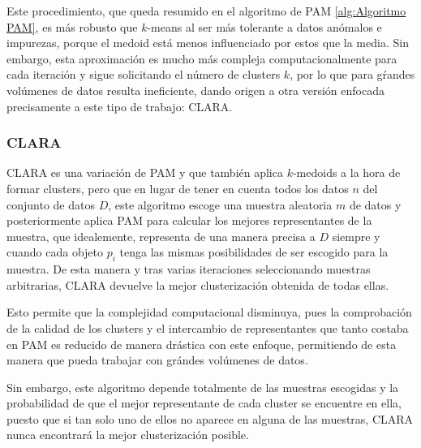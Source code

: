 \documentclass[3p,twocolumn]{elsarticle}
\begin{document}
Este procedimiento, que queda resumido en el algoritmo de PAM \ref{alg:Algoritmo PAM}, es más robusto que $k$-means al ser más tolerante a datos anómalos e impurezas, porque el medoid está menos influenciado por estos que la media. Sin embargo, esta aproximación es mucho más compleja computacionalmente para cada iteración y sigue solicitando el número de clusters $k$, por lo que para gŕandes volúmenes de datos resulta ineficiente, dando origen a otra versión enfocada precisamente a este tipo de trabajo: CLARA.




\subsubsection{\textbf{CLARA}}

CLARA es una variación de PAM y que también aplica $k$-medoids a la hora de formar clusters, pero que en lugar de tener en cuenta todos los datos $n$ del conjunto de datos $D$, este algoritmo escoge una muestra aleatoria $m$ de datos y posteriormente aplica PAM para calcular los mejores representantes de la muestra, que idealemente, representa de una manera precisa a $D$ siempre y cuando cada objeto $p_i$ tenga las mismas posibilidades de ser escogido para la muestra. De esta manera y tras varias iteraciones seleccionando muestras arbitrarias, CLARA devuelve la mejor clusterización obtenida de todas ellas.

Esto permite que la complejidad computacional disminuya, pues la comprobación de la calidad de los clusters y el intercambio de representantes que tanto costaba en PAM es reducido de manera drástica con este enfoque, permitiendo de esta manera que pueda trabajar con grándes volúmenes de datos.

Sin embargo, este algoritmo depende totalmente de las muestras escogidas y la probabilidad de que el mejor representante de cada cluster se encuentre en ella, puesto que si tan solo uno de ellos no aparece en alguna de las muestras, CLARA nunca encontrará la mejor clusterización posible. 


\end{document}
